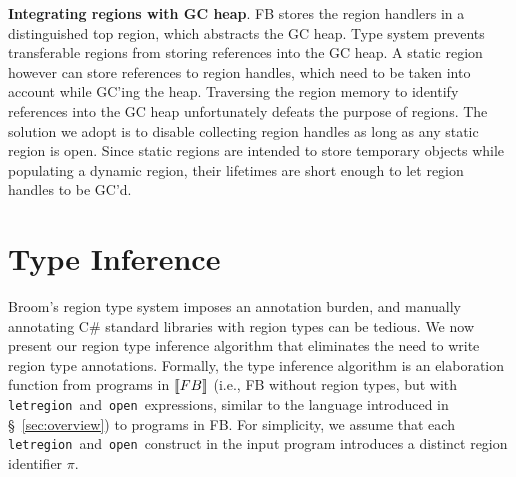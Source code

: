 \documentclass[a4paper,UKenglish]{lipics-v2018}
\newcommand{\C}[1]{\code{#1}}
\newcommand{\code}[1]{\,{\tt #1}\,}
\newcommand{\thesemof}[1]{ \llbracket #1 \rrbracket}
\newcommand{\absof}[1]{\thesemof{#1}}
\newcommand{\name}{{\sc Broom}\xspace}
\newcommand{\FB}{{\sc FB}\xspace}
\newcommand{\rgn}{r}
\begin{document}
{\bf Integrating regions with GC heap}. \FB stores the region handlers in a
distinguished top region, which abstracts the GC heap. Type system
prevents transferable regions from storing references into the GC
heap. A static region however can store references to region handles,
which need to be taken into account while GC'ing the heap. Traversing
the region memory to identify references into the GC heap
unfortunately defeats the purpose of regions. The solution we adopt is
to disable collecting region handles as long as any static region is
open. Since static regions are intended to store temporary objects
while populating a dynamic region, their lifetimes are short enough to
let region handles to be GC’d.  


\renewcommand{\rgn}{\pi}
\newcommand{\deltaPC}{\Delta_P^C}

\newcommand{\soln}{\eta}
\newcommand{\solnR}{\soln_R}
\newcommand{\solnP}{\soln_P}
\newcommand{\thesoln}{\hat{\eta}}
\newcommand{\thesolnR}{\thesoln_R}
\newcommand{\thesolnP}{\thesoln_P}

\newcommand{\saturate}[1]{{#1}^*}
\newcommand{\myground}[1]{\saturate{#1}_g}
\newcommand{\consOf}[1]{\textsc{GenConstraint}(#1)}
\newcommand{\satC}{\saturate{C}}
\newcommand{\groundC}{\myground{C}}
\newcommand{\rhoC}{\text{WF}_R}
\newcommand{\solveCon}[1]{\textsc{Solve}(#1)}

\section{Type Inference}
\label{sec:type-inference}

\name's region type system imposes an annotation burden, and
manually annotating C\# standard libraries with region types
can be tedious. We now present our region type inference algorithm
that eliminates the need to write region type annotations.
Formally, the type inference
algorithm is an elaboration function from programs in $\absof{\FB}$
(i.e., \FB without region types, but with \C{letregion} and \C{open}
expressions, similar to the language introduced in
\S~\ref{sec:overview}) to programs in \FB.
For simplicity, we assume that each \C{letregion} and \C{open} construct
in the input program introduces a distinct region identifier $\pi$.
\end{document}
